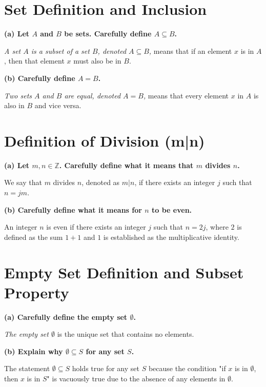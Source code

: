 \section*{Set Definition and Inclusion}

\textbf{(a) Let \( A \) and \( B \) be sets. Carefully define \( A \subseteq B \).}

\textit{A set \( A \) is a subset of a set \( B \), denoted \( A \subseteq B \),} means that if an element \( x \) is in \( A \), then that element \( x \) must also be in \( B \).

\textbf{(b) Carefully define \( A = B \).}

\textit{Two sets \( A \) and \( B \) are equal, denoted \( A = B \),} means that every element \( x \) in \( A \) is also in \( B \) and vice versa.

\section*{Definition of Division (m|n)}

\textbf{(a) Let \( m, n \in \mathbb{Z} \). Carefully define what it means that \( m \) divides \( n \).}

We say that \( m \) divides \( n \), denoted as \( m | n \), if there exists an integer \( j \) such that \( n = jm \).

\textbf{(b) Carefully define what it means for \( n \) to be even.}

An integer \( n \) is even if there exists an integer \( j \) such that \( n = 2j \), where \( 2 \) is defined as the sum \( 1 + 1 \) and \( 1 \) is established as the multiplicative identity.

\section*{Empty Set Definition and Subset Property}

\textbf{(a) Carefully define the empty set \( \emptyset \).}

\textit{The empty set \( \emptyset \)} is the unique set that contains no elements.

\textbf{(b) Explain why \( \emptyset \subseteq S \) for any set \( S \).}

The statement \textit{\( \emptyset \subseteq S \)} holds true for any set \( S \) because the condition "if \( x \) is in \( \emptyset \), then \( x \) is in \( S \)" is vacuously true due to the absence of any elements in \( \emptyset \).

